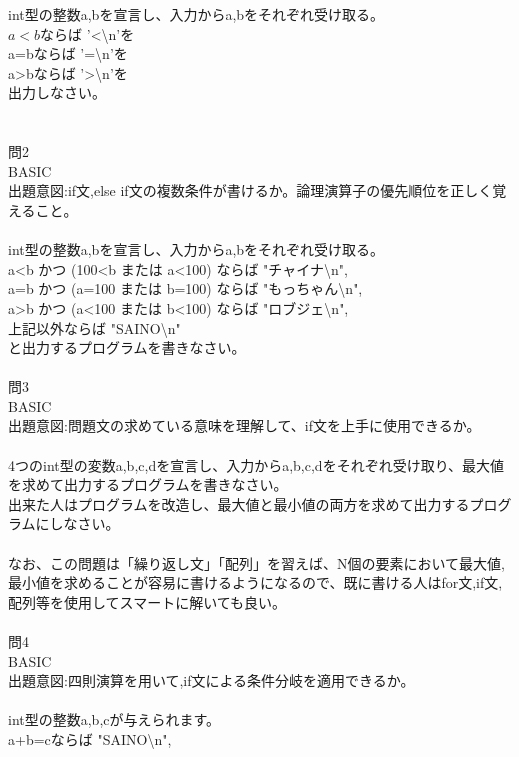 \documentclass[a4j,titlepage,dvipdfmx]{jsarticle}   %
\begin{document}
int型の整数a,bを宣言し、入力からa,bをそれぞれ受け取る。\\
$a<b$ならば '<\textbackslash n'を\\
a=bならば '=\textbackslash n'を\\
a>bならば '>\textbackslash n'を\\
出力しなさい。\\
\\
\\
問2\\
BASIC\\
出題意図:if文,else if文の複数条件が書けるか。論理演算子の優先順位を正しく覚えること。\\
\\
int型の整数a,bを宣言し、入力からa,bをそれぞれ受け取る。\\
a<b かつ (100<b または a<100) 	ならば "チャイナ\textbackslash n",\\
a=b かつ (a=100 または b=100) 	ならば "もっちゃん\textbackslash n",\\
a>b かつ (a<100 または b<100) 	ならば "ロブジェ\textbackslash n",\\
上記以外ならば "SAINO\textbackslash n"\\
と出力するプログラムを書きなさい。\\
\\
問3\\
BASIC\\
出題意図:問題文の求めている意味を理解して、if文を上手に使用できるか。\\
\\
4つのint型の変数a,b,c,dを宣言し、入力からa,b,c,dをそれぞれ受け取り、最大値を求めて出力するプログラムを書きなさい。\\
出来た人はプログラムを改造し、最大値と最小値の両方を求めて出力するプログラムにしなさい。\\
\\
なお、この問題は「繰り返し文」「配列」を習えば、N個の要素において最大値,最小値を求めることが容易に書けるようになるので、既に書ける人はfor文,if文,配列等を使用してスマートに解いても良い。\\
\\
問4\\
BASIC\\
出題意図:四則演算を用いて,if文による条件分岐を適用できるか。\\
\\
int型の整数a,b,cが与えられます。\\
a+b=cならば "SAINO\textbackslash n",\\
\end{document}
